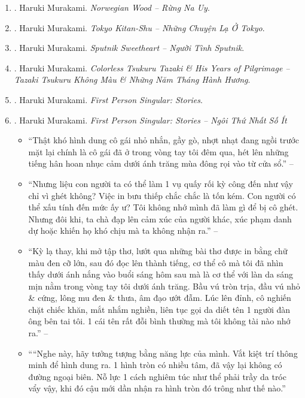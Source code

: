 \documentclass{article}
\begin{document}
\begin{enumerate}
	\item \cite{Murakami_Norwegian_wood}. Haruki Murakami. {\it Norwegian Wood -- Rừng Na Uy}.\hfill{\sf[done]}
	\item \cite{Murakami_Tokyo}. Haruki Murakami. {\it Tokyo Kitan-Shu -- Những Chuyện Lạ Ở Tokyo}.\hfill{\sf[done]}
	\item \cite{Murakami_Sputnik}. Haruki Murakami. {\it Sputnik Sweetheart -- Người Tình Sputnik}.\hfill{\sf[done]}
	\item \cite{Murakami_Tsukuru_Tazaki_VN}. Haruki Murakami. {\it Colorless Tsukuru Tazaki \& His Years of Pilgrimage -- Tazaki Tsukuru Không Màu \& Những Năm Tháng Hành Hương}.\hfill{\sf[done]}
	\item \cite{Murakami_1st_person}. {\sc Haruki Murakami}. {\it First Person Singular: Stories}.
	\item \cite{Murakami_ngoi_1}. {\sc Haruki Murakami}. {\it First Person Singular: Stories -- Ngôi Thứ Nhất Số Ít}\hfill{\sf[done]}
	\begin{itemize}
		\item ``Thật khó hình dung cô gái nhỏ nhắn, gầy gò, nhợt nhạt đang ngồi trước mặt lại chính là cô gái đã ở trong vòng tay tôi đêm qua, hét lên những tiếng hân hoan nhục cảm dưới ánh trăng mùa đông rọi vào từ cửa sổ.'' -- \cite[Trên Gối Đá, p. 14]{Murakami_ngoi_1}
		\item ``Nhưng liệu con người ta có thể làm 1 vụ quấy rối kỳ công đến như vậy chỉ vì ghét không? Việc in bưu thiếp chắc chắc là tốn kém. Con người có thể xấu tính đến mức ấy ư? Tôi không nhớ mình đã làm gì để bị cô ghét. Nhưng đôi khi, ta chà đạp lên cảm xúc của người khác, xúc phạm danh dự hoặc khiến họ khó chịu mà ta không nhận ra.'' -- \cite[Kem, pp. 34--35]{Murakami_ngoi_1}
		\item ``Kỳ lạ thay, khi mở tập thơ, lướt qua những bài thơ được in bằng chữ màu đen cỡ lớn, sau đó đọc lên thành tiếng, cơ thể cô mà tôi đã nhìn thấy dưới ánh nắng vào buổi sáng hôm sau mà là cơ thể với làn da sáng mịn nằm trong vòng tay tôi dưới ánh trăng. Bầu vú tròn trịa, đầu vú nhỏ \& cứng, lông mu đen \& thưa, âm đạo ướt đẫm. Lúc lên đỉnh, cô nghiến chặt chiếc khăn, mắt nhắm nghiền, liên tục gọi da diết tên 1 người đàn ông bên tai tôi. 1 cái tên rất đỗi bình thường mà tôi không tài nào nhớ ra.'' -- \cite[Trên Gối Đá, p. 19]{Murakami_ngoi_1}
		\item ````Nghe này, hãy tưởng tượng bằng năng lực của mình. Vắt kiệt trí thông minh để hình dung ra. 1 hình tròn có nhiều tâm, đã vậy lại không có đường ngoại biên. Nỗ lực 1 cách nghiêm túc như thể phải trầy da tróc vẩy vậy, khi đó cậu mới dần nhận ra hình tròn đó trông như thế nào.''
		

\end{itemize}
\end{enumerate}
\end{document}
